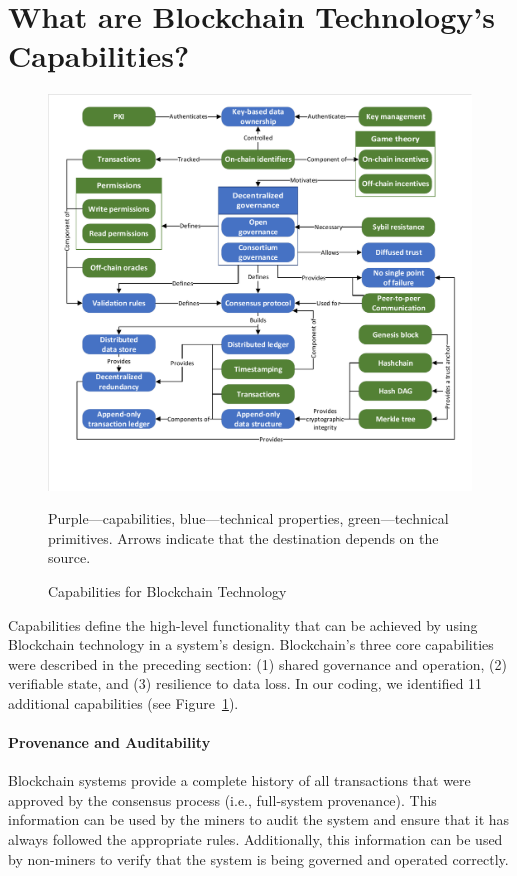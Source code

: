 \section{What are Blockchain Technology's Capabilities?}
\label{sec:capabilities}

\begin{figure}
	\centering
	\includegraphics[page=4,width=\columnwidth]{figures/grounded-theory-main}
	
	{\small Purple---capabilities, blue---technical properties, green---technical primitives. Arrows indicate that the destination depends on the source.}
	\caption{Capabilities for Blockchain Technology}
	\label{fig:Capabilities}
\end{figure}

Capabilities define the high-level functionality that can be achieved by using Blockchain technology in a system's design.
Blockchain's three core capabilities were described in the preceding section: (1) shared governance and operation, (2) verifiable state, and (3) resilience to data loss.
In our coding, we identified 11 additional capabilities (see Figure~\ref{fig:Capabilities}).

\paragraph{Provenance and Auditability}
Blockchain systems provide a complete history of all transactions that were approved by the consensus process (i.e., full-system provenance).
This information can be used by the miners to audit the system and ensure that it has always followed the appropriate rules.
Additionally, this information can be used by non-miners to verify that the system is being governed and operated correctly.

